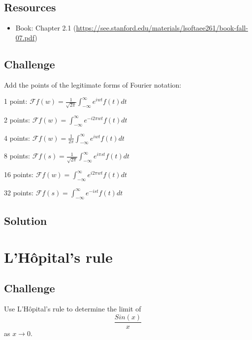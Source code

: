 \subsection*{Resources}
\begin{itemize}
    \item Book: Chapter 2.1 (\url{https://see.stanford.edu/materials/lsoftaee261/book-fall-07.pdf})
\end{itemize}

\subsection*{Challenge}
Add the points of the legitimate forms of Fourier notation:

1 point: $\displaystyle \mathcal{F}f(w)=\frac{1}{\sqrt{2 \pi}} \int_{-\infty}^{\infty} e^{i w t} f(t) dt$

2 points: $\displaystyle \mathcal{F}f(w)=\int_{-\infty}^{\infty} e^{-i 2 \pi w t} f(t) dt$

4 points: $\displaystyle \mathcal{F}f(w)=\frac{1}{2 \pi} \int_{-\infty}^{\infty} e^{i w t} f(t) dt$

8 points: $\displaystyle \mathcal{F}f(s)=\frac{1}{\sqrt{2 \pi}} \int_{-\infty}^{\infty} e^{i \pi s t} f(t) dt$

16 points: $\displaystyle \mathcal{F}f(w)=\int_{-\infty}^{\infty} e^{i 2 \pi w t} f(t) dt$

32 points: $\displaystyle \mathcal{F}f(s)=\int_{-\infty}^{\infty} e^{-i s t} f(t) dt$

\subsection*{Solution}




\newpage
\section{L'H\^opital's rule}

\subsection*{Challenge}
Use L'H\^opital's rule to determine the limit of
\begin{equation}
    \frac{Sin(x)}{x}
\end{equation}
as $x \rightarrow 0$.

